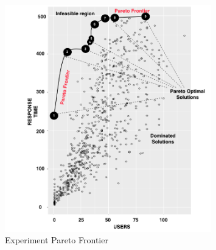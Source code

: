 \documentclass[espaco=umemeio,chapter=TITLE,twoside,openright]{abnt}
\begin{document}
\begin{figure}[h]
\centering
\includegraphics[width=0.8\textwidth]{./images/pareto0curve.png}
    \caption{Experiment Pareto Frontier}
\label{fig:paretofrontier1}
\end{figure}
\end{document}
